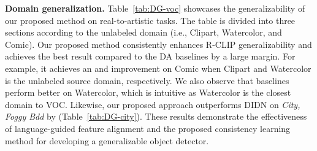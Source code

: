 \textbf{Domain generalization.} 
 Table~\ref{tab:DG-voc} showcases the generalizability of our proposed method on real-to-artistic tasks. The table is divided into three sections according to the unlabeled domain (i.e., Clipart, Watercolor, and Comic). Our proposed method consistently enhances R-CLIP generalizability and achieves the best result compared to the DA baselines by a large margin. For example, it achieves an  and  improvement on Comic when Clipart and Watercolor is the unlabeled source domain, respectively. We also observe that baselines perform better on Watercolor, which is intuitive as Watercolor is the closest domain to VOC. Likewise, our proposed approach outperforms DIDN on \emph{City, Foggy  Bdd} by  (Table~\ref{tab:DG-city}). These results demonstrate the effectiveness of language-guided feature alignment and the proposed consistency learning method for developing a generalizable object detector. 
 

